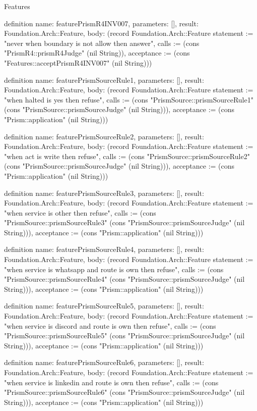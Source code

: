 \begin{lexlean}{Features}
\begin{semanticmodule}
definition{
  name: featurePrismR4INV007,
  parameters: [],
  result: Foundation.Arch::Feature,
  body: (record Foundation.Arch::Feature {statement := "never when boundary is not allow then answer", calls := (cons "PrismR4::prismR4Judge" (nil String)), acceptance := (cons "Features::acceptPrismR4INV007" (nil String))})
}

definition{
  name: featurePrismSourceRule1,
  parameters: [],
  result: Foundation.Arch::Feature,
  body: (record Foundation.Arch::Feature {statement := "when halted is yes then refuse", calls := (cons "PrismSource::prismSourceRule1" (cons "PrismSource::prismSourceJudge" (nil String))), acceptance := (cons "Prism::application" (nil String))})
}

definition{
  name: featurePrismSourceRule2,
  parameters: [],
  result: Foundation.Arch::Feature,
  body: (record Foundation.Arch::Feature {statement := "when act is write then refuse", calls := (cons "PrismSource::prismSourceRule2" (cons "PrismSource::prismSourceJudge" (nil String))), acceptance := (cons "Prism::application" (nil String))})
}

definition{
  name: featurePrismSourceRule3,
  parameters: [],
  result: Foundation.Arch::Feature,
  body: (record Foundation.Arch::Feature {statement := "when service is other then refuse", calls := (cons "PrismSource::prismSourceRule3" (cons "PrismSource::prismSourceJudge" (nil String))), acceptance := (cons "Prism::application" (nil String))})
}

definition{
  name: featurePrismSourceRule4,
  parameters: [],
  result: Foundation.Arch::Feature,
  body: (record Foundation.Arch::Feature {statement := "when service is whatsapp and route is own then refuse", calls := (cons "PrismSource::prismSourceRule4" (cons "PrismSource::prismSourceJudge" (nil String))), acceptance := (cons "Prism::application" (nil String))})
}

definition{
  name: featurePrismSourceRule5,
  parameters: [],
  result: Foundation.Arch::Feature,
  body: (record Foundation.Arch::Feature {statement := "when service is discord and route is own then refuse", calls := (cons "PrismSource::prismSourceRule5" (cons "PrismSource::prismSourceJudge" (nil String))), acceptance := (cons "Prism::application" (nil String))})
}

definition{
  name: featurePrismSourceRule6,
  parameters: [],
  result: Foundation.Arch::Feature,
  body: (record Foundation.Arch::Feature {statement := "when service is linkedin and route is own then refuse", calls := (cons "PrismSource::prismSourceRule6" (cons "PrismSource::prismSourceJudge" (nil String))), acceptance := (cons "Prism::application" (nil String))})
}


\end{semanticmodule}
\end{lexlean}
